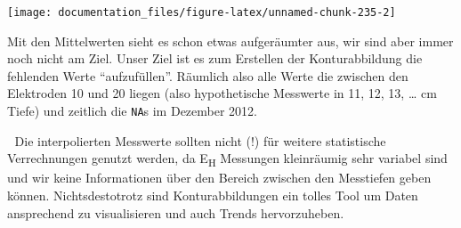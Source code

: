 \documentclass[
]{article}
\begin{document}
\begin{center}\texttt{[image: documentation\_files/figure-latex/unnamed-chunk-235-2]} \end{center}

Mit den Mittelwerten sieht es schon etwas aufgeräumter aus, wir sind aber immer noch nicht am Ziel. Unser Ziel ist es zum Erstellen der Konturabbildung die fehlenden Werte ``aufzufüllen''. Räumlich also alle Werte die zwischen den Elektroden 10 und 20 liegen (also hypothetische Messwerte in 11, 12, 13, \ldots{} cm Tiefe) und zeitlich die \texttt{NA}s im Dezember 2012.

🚨 Die interpolierten Messwerte sollten nicht (!) für weitere statistische Verrechnungen genutzt werden, da E\textsubscript{H} Messungen kleinräumig sehr variabel sind und wir keine Informationen über den Bereich zwischen den Messtiefen geben können. Nichtsdestotrotz sind Konturabbildungen ein tolles Tool um Daten ansprechend zu visualisieren und auch Trends hervorzuheben.
\end{document}
